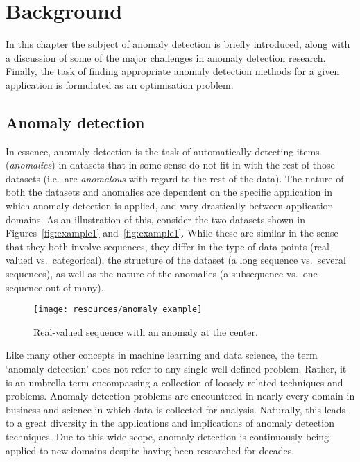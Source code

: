 \chapter{Background}
\label{ch:background}

In this chapter the subject of anomaly detection is briefly introduced, along with a discussion of some of the major challenges in anomaly detection research. Finally, the task of finding appropriate anomaly detection methods for a given application is formulated as an optimisation problem.

\section{Anomaly detection}
\label{sect:adb}

In essence, anomaly detection is the task of automatically detecting items (\emph{anomalies}) in datasets that in some sense do not fit in with the rest of those datasets (i.e.\ are \emph{anomalous} with regard to the rest of the data). The nature of both the datasets and anomalies are dependent on the specific application in which anomaly detection is applied, and vary drastically between application domains. As an illustration of this, consider the two datasets shown in Figures~\ref{fig:example1} and~\ref{fig:example1}. While these are similar in the sense that they both involve sequences, they differ in the type of data points (real-valued vs.\ categorical), the structure of the dataset (a long sequence vs.\ several sequences), as well as the nature of the anomalies (a subsequence vs.\ one sequence out of many).

\begin{figure}[htb]
    \centering
    \texttt{[image: resources/anomaly\_example]}
    \caption{\small Real-valued sequence with an anomaly at the center.}
    \vspace{-0pt}
\label{fig:example2}
\end{figure}

Like many other concepts in machine learning and data science, the term `anomaly detection' does not refer to any single well-defined problem. Rather, it is an umbrella term encompassing a collection of loosely related techniques and problems. Anomaly detection problems are encountered in nearly every domain in business and science in which data is collected for analysis. Naturally, this leads to a great diversity in the applications and implications of anomaly detection techniques. Due to this wide scope, anomaly detection is continuously being applied to new domains despite having been researched for decades.

